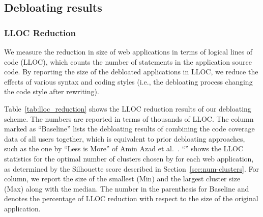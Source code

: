 \subsection{Debloating results}

\subsubsection{LLOC Reduction}
 
We measure the reduction in size of web applications in terms of logical lines of code (LLOC), which counts the number of statements in the application source code. 
By reporting the size of the debloated applications in LLOC, we reduce the effects of various syntax and coding styles (i.e., the debloating process changing the code style after rewriting). 

Table~\ref{tab:lloc_reduction} shows the LLOC reduction results of our debloating scheme. 
The numbers are reported in terms of thousands of LLOC. 
The column marked as ``Baseline'' lists the debloating results of combining the code coverage data of all users together, which is equivalent to prior debloating approaches, such as the one by ``Less is More'' of Amin Azad et al.~\cite{lessismore}.
``\sys{}'' shows the LLOC statistics for the optimal number of clusters chosen by \sys{} for each web application, as determined by the Silhouette score described in Section~\ref{sec:num-clusters}. 
For \sys{} column, we report the size of the smallest (Min) and the largest cluster size (Max) along with the median. 
The number in the parenthesis for Baseline and \sys{} denotes the percentage of LLOC reduction with respect to the size of the original application. 

